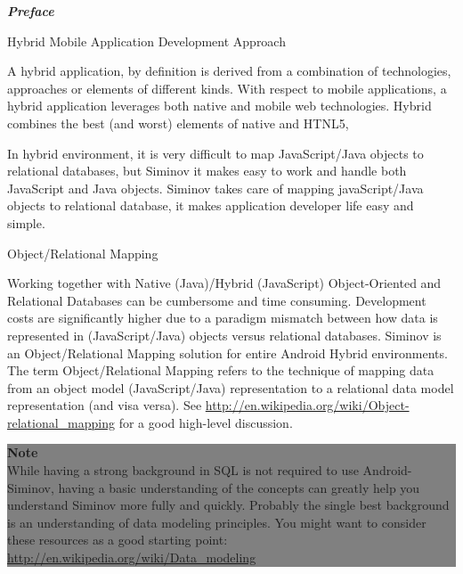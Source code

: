 \newpage
{}
\begin{flushleft}
	\textbf{\emph{\Large{Preface}}}
\end{flushleft}


Hybrid Mobile Application Development	Approach

A hybrid application, by definition is derived from a combination of technologies, approaches or elements of different kinds. With respect to mobile applications, a hybrid application leverages both native and mobile web technologies. Hybrid combines the best (and worst) elements of native and HTNL5, 


In hybrid environment, it is very difficult to  map JavaScript/Java objects to relational databases, but Siminov it makes easy to work and handle both JavaScript and Java objects. Siminov takes care of mapping javaScript/Java objects to relational database, it makes application developer life easy and simple.


\small
Object/Relational Mapping

Working together with Native (Java)/Hybrid (JavaScript) Object-Oriented and Relational Databases can be cumbersome and time consuming. Development costs are significantly higher due to a paradigm mismatch between how data is represented in (JavaScript/Java) objects versus relational databases. Siminov is an Object/Relational Mapping solution for entire Android Hybrid environments. The term Object/Relational Mapping refers to the technique of mapping data from an object model (JavaScript/Java) representation to a relational data model representation (and visa versa). See \url{http://en.wikipedia.org/wiki/Object-relational_mapping} for a good high-level discussion.






\begin{center}
	\colorbox{grey}{
		\parbox[t]{.8\linewidth}{
			\fontsize{11pt}{11pt}\selectfont %
			\vspace*{0.7cm} %
		
			\hfill \textbf{Note} \\
			\hfill While having a strong background in SQL is not required to use Android-Siminov, having a basic understanding of the concepts can greatly help you understand Siminov more fully and quickly. Probably the single best background is an understanding of data modeling principles. You might want to consider these resources as a good starting point: \url{http://en.wikipedia.org/wiki/Data_modeling}\\
		
			\vspace*{0.7cm} %
		}
}

\end{center}


